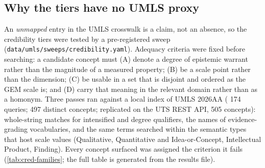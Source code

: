 \subsection{Why the tiers have no UMLS proxy}
\label{sec:supp-credibility-umls}

An \emph{unmapped} entry in the UMLS crosswalk is a claim, not an absence,
so the credibility tiers were tested by a pre-registered sweep
(\texttt{data/umls/sweeps/credibility.yaml}). Adequacy criteria were fixed
before searching: a candidate concept must (A) denote a degree of epistemic
warrant rather than the magnitude of a measured property; (B) be a scale
point rather than the dimension; (C) be usable in a set that is disjoint and
ordered as the GEM scale is; and (D) carry that meaning in the relevant
domain rather than as a homonym. Three passes ran against a local index of
UMLS 2026AA (%
174 queries; 497 distinct concepts; replicated
on the UTS REST API, 505 concepts): whole-string matches for
intensified and degree qualifiers, the names of evidence-grading
vocabularies, and the same terms searched within the semantic types that
host scale values (Qualitative, Quantitative and Idea-or-Concept, Intellectual
Product, Finding). Every concept surfaced was assigned the criterion it
fails (\cref{tab:cred-families}; the full table is generated from the
results file).

